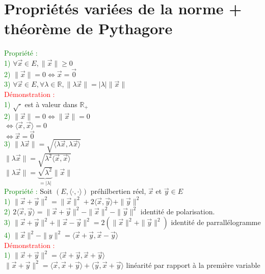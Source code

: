 \documentclass{article}
\begin{document}
\section{Propriétés variées de la norme + théorème de Pythagore}
\textcolor{green}{Propriété :} \\
\textcolor{green}{1)} $\forall \vec x \in E, \| \vec x \| \geq 0$ \\
\textcolor{green}{2)} $\| \vec x \| =0 \Leftrightarrow \vec x = \vec 0$ \\
\textcolor{green}{3)} $\forall \vec x \in E, \forall \lambda \in \mathbb R, \| \lambda \vec x \| = |\lambda| \| \vec x \|$ \\
\textcolor{red}{Démonstration :} \\
\textcolor{green}{1)} $\sqrt{\cdot }$ est à valeur dans $\mathbb R_+$ \\
\textcolor{green}{2)} $\|\vec x \| =0 \Leftrightarrow \| \vec x \|=0$ \\
$\Leftrightarrow \langle \vec x, \vec x \rangle=0$ \\
$\Leftrightarrow \vec x =  \vec 0$ \\
\textcolor{green}{3)} $\| \lambda \vec x \| = \sqrt{\langle \lambda \vec x, \lambda \vec x \rangle}$ \\
$\| \lambda \vec x \|= \sqrt{\lambda^2\langle \vec x, \vec x \rangle}$ \\
$\| \lambda \vec x \|= \underbrace{\sqrt{\lambda^2}}_{= | \lambda |} \| \vec x \|$ \\
\textcolor{green}{Propriété :} Soit $(E, \langle \cdot,\cdot \rangle)$ préhilbertien réel, $\vec x$ et $\vec y \in E$ \\
\textcolor{green}{1)} $\| \vec x +\vec y \|^2= \| \vec x \|^2 + 2 \langle \vec x , \vec y \rangle + \| \vec y \|^2$ \\
\textcolor{green}{2)} $2 \langle \vec x , \vec y \rangle= \| \vec x + \vec y \|^2- \| \vec x \|^2- \| \vec y \|^2$ identité de polarisation. \\
\textcolor{green}{3)} $\| \vec x+ \vec y \|^2 + \| \vec x - \vec y \|^2= 2 (\|\vec x \|^2 + \| \vec y \|^2)$ identité de parrallélogramme \\
\textcolor{green}{4)} $\| \vec x \|^2 - \| y \|^2= \langle \vec x + \vec y, \vec x - \vec y \rangle$ \\
\textcolor{red}{Démonstration :} \\
\textcolor{green}{1)} $\| \vec x + \vec y \|^2= \langle \vec x + \vec y, \vec x + \vec y \rangle$ \\
$\| \vec x + \vec y \|^2= \langle \vec x, \vec x + \vec y \rangle+\langle \vec y, \vec x + \vec y \rangle$ linéarité par rapport à la première variable \\
\end{document}
